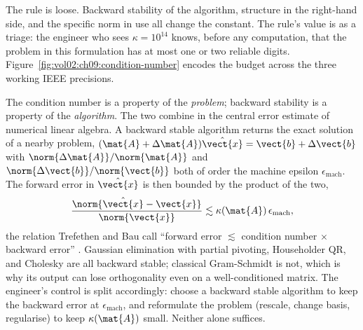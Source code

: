 The rule is loose. Backward stability of the algorithm, structure
in the right-hand side, and the specific norm in use all change
the constant. The rule's value is as a triage: the engineer who
sees $\kappa = 10^{14}$ knows, before any computation, that the
problem in this formulation has at most one or two reliable
digits. Figure~\ref{fig:vol02:ch09:condition-number} encodes the
budget across the three working IEEE precisions.



\begin{mastery}
The condition number is a property of the \emph{problem}; backward
stability is a property of the \emph{algorithm}. The two combine in
the central error estimate of numerical linear algebra. A backward
stable algorithm returns the exact solution of a nearby problem,
$(\mat{A} + \Delta\mat{A})\hat{\vect{x}} = \vect{b} + \Delta\vect{b}$
with $\norm{\Delta\mat{A}}/\norm{\mat{A}}$ and $\norm{\Delta\vect{b}}/
\norm{\vect{b}}$ both of order the machine epsilon $\epsilon_{\text{mach}}$.
The forward error in $\hat{\vect{x}}$ is then bounded by the product
of the two,
\[
\frac{\norm{\hat{\vect{x}} - \vect{x}}}{\norm{\vect{x}}} \lesssim
\kappa(\mat{A})\,\epsilon_{\text{mach}},
\]
the relation Trefethen and Bau call ``forward error $\lesssim$
condition number $\times$ backward error''
\cite[ch.~15]{text:trefethen-bau1997}. Gaussian elimination with
partial pivoting, Householder QR, and Cholesky are all backward
stable; classical Gram-Schmidt is not, which is why its output can
lose orthogonality even on a well-conditioned matrix. The engineer's
control is split accordingly: choose a backward stable algorithm to
keep the backward error at $\epsilon_{\text{mach}}$, and reformulate
the problem (rescale, change basis, regularise) to keep
$\kappa(\mat{A})$ small. Neither alone suffices.
\end{mastery}

